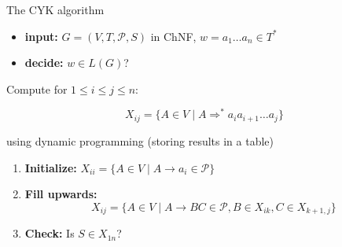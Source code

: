 \documentclass[handout]{beamer}
\begin{document}
\begin{frame}{The CYK algorithm}

	\begin{itemize}
		\item \textbf{input:} $G=(V,T,\mathcal P,S)$ in ChNF, $w=a_1\dots a_n\in T^*$
		\item \textbf{decide:} $w\in L(G)$?
	\end{itemize}	
	
	\begin{multicols}{2}
		Compute for $1\leq i\leq j\leq n$:
		
		\vspace{-24pt}
		$$
		X_{ij}=\{A\in V\mid A\Rightarrow^* a_ia_{i+1}\ldots a_j\}
		$$
		\vspace{-24pt}

		using dynamic programming (storing results in a table)
		
		\begin{center}
		\end{center}		
	\end{multicols}

	\begin{enumerate}
		\item \textbf{Initialize:} $X_{ii}=\{A\in V\mid A\to a_i \in \mathcal P\}$
		\item \textbf{Fill upwards:} $$X_{ij}=\{A\in V\mid A\to BC\in \mathcal P,B\in X_{ik}, C\in X_{k+1,j}\}$$
		\item \textbf{Check:} Is $S\in X_{1n}$?
	\end{enumerate}	

\end{frame}
\end{document}
